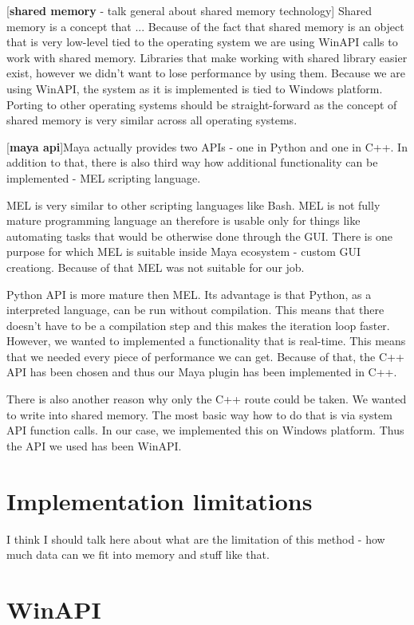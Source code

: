 \documentclass[
  digital, %
  table,   %
  nolof,     %
  nolot,     %
]{fithesis3}
\begin{document}
[\textbf{shared memory} - talk general about shared memory technology]
Shared memory is a concept that ... Because of the fact that shared memory is an object that is very low-level tied to the operating system we are using WinAPI calls to work with shared memory. Libraries that make working with shared library easier exist, however we didn't want to lose performance by using them. Because we are using WinAPI, the system as it is implemented is tied to Windows platform. Porting to other operating systems should be straight-forward as the concept of shared memory is very similar across all operating systems.

[\textbf{maya api}]Maya actually provides two APIs - one in Python and one in C++. In addition to that, there is also third way how additional functionality can be implemented - MEL scripting language.

MEL is very similar to other scripting languages like Bash. MEL is not fully mature programming language an therefore is usable only for things like automating tasks that would be otherwise done through the GUI. There is one purpose for which MEL is suitable inside Maya ecosystem - custom GUI creationg. Because of that MEL was not suitable for our job.

Python API is more mature then MEL. Its advantage is that Python, as a interpreted language, can be run without compilation. This means that there doesn't have to be a compilation step and this makes the iteration loop faster. However, we wanted to implemented a functionality that is real-time. This means that we needed every piece of performance we can get. Because of that, the C++ API has been chosen and thus our Maya plugin has been implemented in C++.

There is also another reason why only the C++ route could be taken. We wanted to write into shared memory. The most basic way how to do that is via system API function calls. In our case, we implemented this on Windows platform. Thus the API we used has been WinAPI.

\section{Implementation limitations}
I think I should talk here about what are the limitation of this method - how much data can we fit into memory and stuff like that.

\section{WinAPI}
\end{document}
